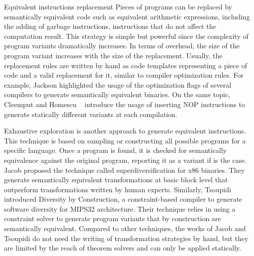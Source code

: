 



\begin{strategy}{Equivalent instructions replacement}
    \label{strategy:S1}
    \normalfont 
    Pieces of programs can be replaced by semantically equivalent code such as equivalent arithmetic expressions, including the adding of garbage instructions, \ie instructions that do not affect the computation result. This strategy is simple but powerful since the complexity of program variants dramatically increases. In terms of overhead, the size of the program variant increases with the size of the replacement. Usually, the replacement rules are written by hand as code templates representing a piece of code and a valid replacement for it, similar to compiler optimization rules. For example, Jackson \etal \cite{jackson2011compiler} highlighted the usage of  the optimization flags of several compilers to generate semantically equivalent binaries. On the same topic, Cleemput \etal \cite{Cleemput2012} and Homescu \etal~\cite{homescu2013profile} introduce the usage of inserting NOP instructions to generate statically different variants at each compilation. 


    Exhaustive exploration is another approach to generate equivalent instructions. This technique is based on sampling or constructing all possible programs for a specific language. Once a program is found, it is checked for semantically equivalence against the original program, reporting it as a variant if is the case.
     Jacob \etal \cite{jacob2008superdiversifier} proposed the technique called superdiversification for x86 binaries. They generate semantically equivalent transformations at basic block level that outperform transformations written by human experts. Similarly, Tsoupidi \etal \cite{Tsoupidi2020ConstraintBasedSD} introduced Diversity by Construction, a constraint-based compiler to generate software diversity for MIPS32 architecture. Their technique relies in using a constraint solver to generate program variants that by construction are semantically equivalent. Compared to other techniques, the works of Jacob \etal and Tsoupidi \etal do not need the writing of transformation strategies by hand, but they are limited by the reach of theorem solvers and can only be applied statically. 
     \\
     \\


\end{strategy}
